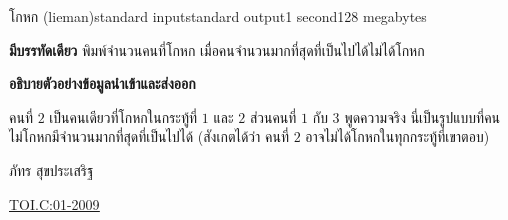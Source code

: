 \documentclass[11pt,a4paper]{article}
\begin{document}
\begin{problem}{โกหก (lieman)}{standard input}{standard output}{1 second}{128 megabytes}
\OutputFile

\textbf{มีบรรทัดเดียว} พิมพ์จำนวนคนที่โกหก เมื่อคนจำนวนมากที่สุดที่เป็นไปได้ไม่ได้โกหก


\Examples

\begin{example}
%
\end{example}

\Note 

\textbf{อธิบายตัวอย่างข้อมูลนำเข้าและส่งออก}

คนที่ $2$ เป็นคนเดียวที่โกหกในกระทู้ที่ $1$ และ $2$ ส่วนคนที่ $1$ กับ $3$ พูดความจริง นี่เป็นรูปแบบที่คนไม่โกหกมีจำนวนมากที่สุดที่เป็นไปได้ (สังเกตได้ว่า คนที่ $2$ อาจไม่ได้โกหกในทุกกระทู้ที่เขาตอบ)

\Source

ภัทร สุขประเสริฐ 

\underline{\href{http://thailandoi.org/toi.c/01-2009}{TOI.C:01-2009}}


\end{problem}
\end{document}
